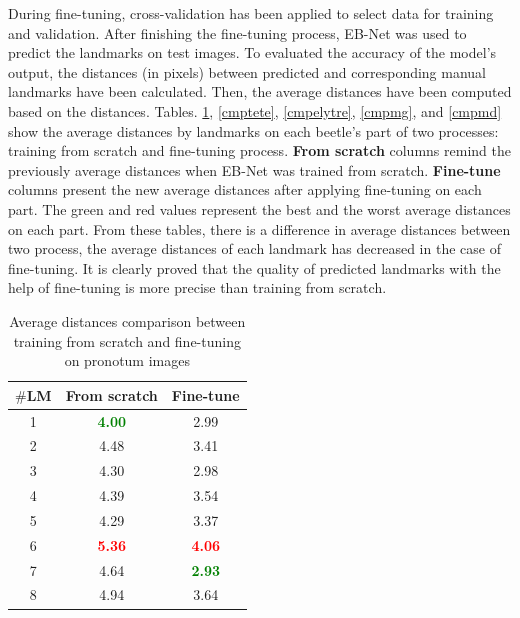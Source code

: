 \documentclass[review]{elsarticle}
\begin{document}
During fine-tuning, cross-validation has been applied to select data for training and validation. After finishing the fine-tuning process, EB-Net was used to predict the landmarks on test images. To evaluated the accuracy of the model's output, the distances (in pixels) between predicted and corresponding manual landmarks have been calculated. Then, the average distances have been computed based on the distances. Tables. \ref{cmppronotum}, \ref{cmptete}, \ref{cmpelytre}, \ref{cmpmg}, and \ref{cmpmd} show the average distances by landmarks on each beetle's part of two processes: training from scratch and fine-tuning process. \textbf{From scratch} columns remind the previously average distances when EB-Net was trained from scratch. \textbf{Fine-tune} columns present the new average distances after applying fine-tuning on each part. The green and red values represent the best and the worst average distances on each part. From these tables, there is a difference in average distances between two process, the average distances of each landmark has decreased in the case of fine-tuning. It is clearly proved that the quality of predicted landmarks with the help of fine-tuning is more precise than training from scratch.
\begin{table}[htbp]
	\centering
	\begin{tabular}{|c|c|c|}
		\hline
		\textbf{$\#$LM} & \textbf{From scratch} & \textbf{Fine-tune} \\ \hline
		1 & \textcolor{green}{\textbf{4.00 }}& 2.99\\ \hline
		2 & 4.48 & 3.41  \\ \hline
		3 & 4.30  & 2.98 \\ \hline
		4 & 4.39  & 3.54\\ \hline
		5 & 4.29  & 3.37 \\ \hline
		6 & \textcolor{red}{\textbf{5.36}}  & \textcolor{red}{\textbf{4.06}} \\ \hline
		7 & 4.64  & \textcolor{green}{\textbf{2.93}} \\ \hline
		8 & 4.94  & 3.64 \\ \hline
	\end{tabular}
	\caption{Average distances comparison between training from scratch and fine-tuning on pronotum images}
	\label{cmppronotum}
\end{table}
\end{document}
